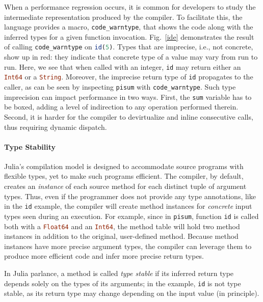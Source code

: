 \documentclass[oneside,openright,titlepage,numbers=noenddot,%
headinclude,footinclude,cleardoublepage=empty,abstract=on,
BCOR=5mm,paper=a4,fontsize=11pt,
dvipsnames
]{scrreprt}
\renewcommand{\c}[1]{\lstinline[language=Julia]!#1!\xspace}
\begin{document}
When a performance regression occurs, it is common for developers to study the
intermediate representation produced by the compiler. To facilitate this, the
language provides a macro, \c{code_warntype}, that shows the code along with the
inferred types for a given function invocation. Fig.~\ref{ide} demonstrates the result of
calling \c{code_warntype} on \c{id(5)}. Types that are imprecise, i.e., not
concrete, show up in red: they indicate that concrete type of a value may vary
from run to run. Here, we see that when called with an integer,
\c{id} may return either an
\c{Int64} or a \c{String}.
Moreover, the imprecise return type of \c{id} propagates to the caller,
as can be seen by inspecting \c{pisum} with \c{code_warntype}.
%
Such type imprecision can impact performance in two ways. First,
the \c{sum} variable has to be boxed, adding a level of indirection to
any operation performed therein. Second, it is harder for
the compiler to devirtualize and inline consecutive calls, thus requiring
dynamic dispatch.

\paragraph{Type Stability}
Julia's compilation model is designed to accommodate source programs
with flexible types, yet to make such programs efficient. The compiler, by
default, creates an \emph{instance} of each source method for each distinct tuple of
argument types. Thus, even if the programmer does not provide any type
annotations, like in the \c{id} example, the compiler will create method
instances for \emph{concrete} input types seen during
an execution. For example, since in \c{pisum}, function \c{id} is called both
with a \c{Float64} and an \c{Int64}, the method table will hold two method instances
in addition to the original, user-defined method.
Because method instances have more precise argument types, the compiler can
leverage them to produce more efficient code and infer more precise return types.

In Julia parlance, a method is called \emph{type stable} if its inferred
return type depends solely on the types of its arguments; in the
example, \c{id} is not type stable, as its return type may change depending on
the input value (in principle).
\end{document}
